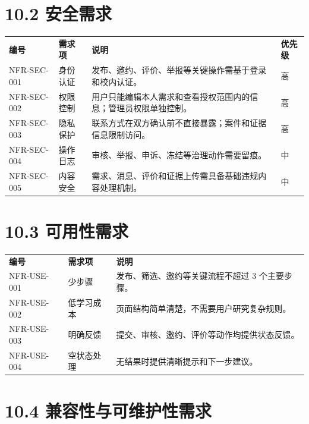 \section{10.2 安全需求}\label{ux5b89ux5168ux9700ux6c42}

{\def\LTcaptype{none} %
\begin{xltabular}{\textwidth}{@{}>{\centering\arraybackslash}X>{\centering\arraybackslash}X>{\centering\arraybackslash}X>{\centering\arraybackslash}X@{}}
\toprule\noalign{}
\endhead
\bottomrule\noalign{}
\endlastfoot
\textbf{编号} & \textbf{需求项} & \textbf{说明} & \textbf{优先级} \\
NFR-SEC-001 & 身份认证 &
发布、邀约、评价、举报等关键操作需基于登录和校内认证。 & 高 \\
NFR-SEC-002 & 权限控制 &
用户只能编辑本人需求和查看授权范围内的信息；管理员权限单独控制。 & 高 \\
NFR-SEC-003 & 隐私保护 &
联系方式在双方确认前不直接暴露；案件和证据信息限制访问。 & 高 \\
NFR-SEC-004 & 操作日志 & 审核、举报、申诉、冻结等治理动作需要留痕。 &
中 \\
NFR-SEC-005 & 内容安全 &
需求、消息、评价和证据上传需具备基础违规内容处理机制。 & 中 \\
\end{xltabular}
}

\section{10.3 可用性需求}\label{ux53efux7528ux6027ux9700ux6c42}

{\def\LTcaptype{none} %
\begin{xltabular}{\textwidth}{@{}>{\centering\arraybackslash}X>{\centering\arraybackslash}X>{\centering\arraybackslash}X@{}}
\toprule\noalign{}
\endhead
\bottomrule\noalign{}
\endlastfoot
\textbf{编号} & \textbf{需求项} & \textbf{说明} \\
NFR-USE-001 & 少步骤 & 发布、筛选、邀约等关键流程不超过 3
个主要步骤。 \\
NFR-USE-002 & 低学习成本 & 页面结构简单清楚，不需要用户研究复杂规则。 \\
NFR-USE-003 & 明确反馈 & 提交、审核、邀约、评价等动作均提供状态反馈。 \\
NFR-USE-004 & 空状态处理 & 无结果时提供清晰提示和下一步建议。 \\
\end{xltabular}
}

\section{10.4
兼容性与可维护性需求}\label{ux517cux5bb9ux6027ux4e0eux53efux7ef4ux62a4ux6027ux9700ux6c42}

